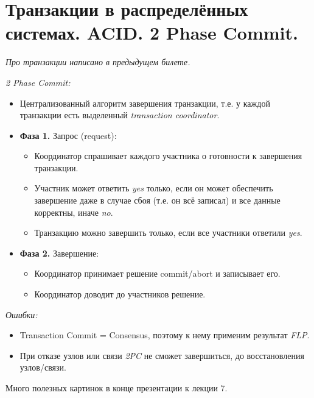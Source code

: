 \section{Транзакции в распределённых системах. ACID. 2 Phase Commit.}

\textit{Про транзакции написано в предыдущем билете.}

\begin{definition} \textit{2 Phase Commit:}
    \begin{itemize}
        \item Централизованный алгоритм завершения транзакции, т.е.
            у каждой транзакции есть выделенный \textit{transaction coordinator}.
        \item \textbf{Фаза 1.} Запрос (request):
            \begin{itemize}
                \item Координатор спрашивает каждого участника о готовности к 
                    завершения транзакции.
                \item Участник может ответить \textit{yes} только, если он может 
                    обеспечить завершение даже в случае сбоя (т.е. он всё записал) 
                    и все данные корректны, иначе \textit{no}.
                \item Транзакцию можно завершить только, если все участники ответили 
                    \textit{yes}.
            \end{itemize}
        \item \textbf{Фаза 2.} Завершение:
            \begin{itemize}
                \item Координатор принимает решение commit/abort и записывает его.
                \item Координатор доводит до участников решение.
            \end{itemize}
    \end{itemize}
\end{definition}

\begin{remark} \textit{Ошибки:}
    \begin{itemize}
        \item Transaction Commit = Consensus, поэтому к нему применим результат 
            \textit{FLP}.
        \item При отказе узлов или связи \textit{2PC} не сможет завершиться, до 
            восстановления узлов/связи.
    \end{itemize}
\end{remark}

\begin{remark}
    Много полезных картинок в конце презентации к лекции 7.
\end{remark}


